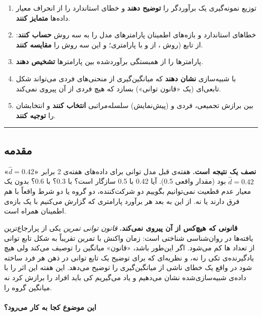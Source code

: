 \begin{enumerate}
\def\labelenumi{\arabic{enumi}.}
\tightlist
\item
  توزیع نمونه‌گیری  یک برآوردگر را
  \textbf{توضیح دهند} و خطای استاندارد  را از انحراف معیار
  داده‌ها \textbf{متمایز کنند}.
\item
  خطاهای استاندارد و بازه‌های اطمینان پارامترهای مدل را به سه روش
  \textbf{حساب کنند}: از  تابع  (روش ، از
   و با  پارامتری؛ و این سه روش را
  \textbf{مقایسه کنند}.
\item
   پارامترها را از همبستگی برآوردشده بین پارامترها
  \textbf{تشخیص دهند}.
\item
  با شبیه‌سازی \textbf{نشان دهند} که میانگین‌گیری از منحنی‌های فردی می‌تواند
  شکل تابعی‌ای (یک «قانون توانی») بسازد که هیچ فردی از آن پیروی نمی‌کند.
\item
  بین برازش تجمیعی، فردی و (پیش‌نمایش) سلسله‌مراتبی \textbf{انتخاب کنند} و
  انتخابشان را \textbf{توجیه کنند}.
\end{enumerate}

\begin{center}\rule{0.5\linewidth}{0.5pt}\end{center}

\subsection{مقدمه}

\textbf{«\(\hat d = 0.42\)» نصف یک نتیجه است.} هفته‌ی قبل  مدل
توانی برای داده‌های هفته‌ی 2 برابر \(\hat d = 0.42\) بود (مقدار واقعی
0.5). آیا 0.42 با 0.5 سازگار است؟ با 0.3؟ با 0.6؟ بدون یک معیار عدم
قطعیت نمی‌توانیم بگوییم دو شرکت‌کننده، دو گروه یا دو شرط واقعاً با هم فرق
دارند یا نه. از این به بعد هر برآورد پارامتری که گزارش می‌کنیم با یک
بازه‌ی اطمینان همراه است.

\textbf{قانونی که هیچ‌کس از آن پیروی نمی‌کند.} \emph{قانون توانی تمرین}
 یکی از پرارجاع‌ترین یافته‌ها در روان‌شناسی
شناختی است: زمان واکنش با تمرین تقریباً به شکل تابع توانی از تعداد
ها کم می‌شود. اگر این‌طور باشد، «قانون» میانگین را توصیف می‌کند
ولی هیچ یادگیرنده‌ی تکی را نه، و نظریه‌ای که برای توضیح یک تابع توانی در
ذهن هر فرد ساخته شود در واقع یک خطای ناشی از میانگین‌گیری را توضیح می‌دهد.
این هفته این اثر را با داده‌ی شبیه‌سازی‌شده نشان می‌دهیم و یاد می‌گیریم کی
باید افراد را برازش کرد نه میانگین گروه را.

\paragraph{این موضوع کجا به کار می‌رود؟}

